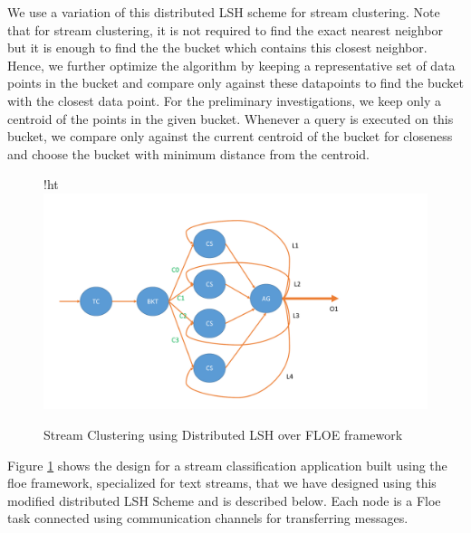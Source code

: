 \documentclass{article} %
\begin{document}
We use a variation of this distributed LSH scheme for stream clustering. Note that for stream clustering, it is not required to find the exact nearest neighbor but it is enough to find the the bucket which contains this closest neighbor. Hence, we further optimize the algorithm by keeping a representative set of data points in the bucket and compare only against these datapoints to find the bucket with the closest data point. For the preliminary investigations, we keep only a centroid of the points in the given bucket. Whenever a query is executed on this bucket, we compare only against the current centroid of the bucket for closeness and choose the bucket with minimum distance from the centroid. 

\begin{figure}{!ht}
\centering
\includegraphics[width=0.8\columnwidth]{streamCluster.pdf}
\caption{Stream Clustering using Distributed LSH over FLOE framework}
\label{fig:design}
\end{figure}

Figure \ref{fig:design} shows the design for a stream classification application built using the floe framework, specialized for text streams, that we have designed using this modified distributed LSH Scheme and is described below. Each node is a Floe task connected using communication channels for transferring messages. 
\end{document}
